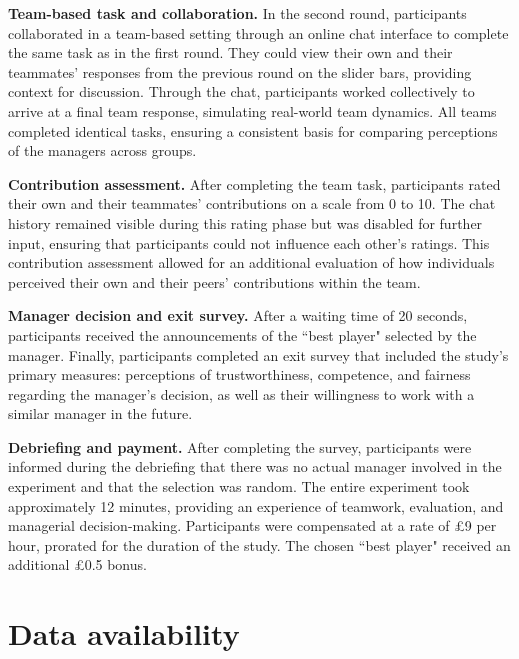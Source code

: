 \documentclass{article}
\begin{document}
{\noindent\textbf{Team-based task and collaboration.}
In the second round, participants collaborated in a team-based setting through an online chat interface to complete the same task as in the first round. They could view their own and their teammates' responses from the previous round on the slider bars, providing context for discussion. Through the chat, participants worked collectively to arrive at a final team response, simulating real-world team dynamics. All teams completed identical tasks, ensuring a consistent basis for comparing perceptions of the managers across groups. 
\vspace{0.3cm}

\noindent\textbf{Contribution assessment.}
After completing the team task, participants rated their own and their teammates’ contributions on a scale from 0 to 10. The chat history remained visible during this rating phase but was disabled for further input, ensuring that participants could not influence each other’s ratings. This contribution assessment allowed for an additional evaluation of how individuals perceived their own and their peers' contributions within the team.
\vspace{0.3cm}

\noindent\textbf{Manager decision and exit survey.}
After a waiting time of 20 seconds, participants received the announcements of the ``best player" selected by the manager.  
Finally, participants completed an exit survey that included the study’s primary measures: perceptions of trustworthiness, competence, and fairness regarding the manager’s decision, as well as their willingness to work with a similar manager in the future. 
\vspace{0.3cm}

\noindent\textbf{Debriefing and payment.} 
After completing the survey, participants were informed during the debriefing that there was no actual manager involved in the experiment and that the selection was random. The entire experiment took approximately 12 minutes, providing an experience of teamwork, evaluation, and managerial decision-making. Participants were compensated at a rate of \pounds9 per hour, prorated for the duration of the study. The chosen ``best player" received an additional \pounds0.5 bonus. 

}


\section*{Data availability}
\end{document}
